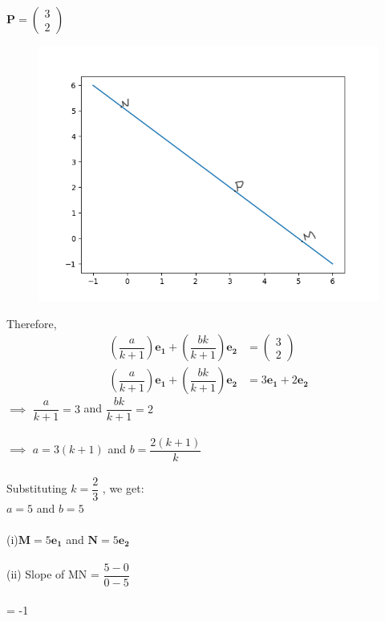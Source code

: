 \documentclass[journal,12pt,twocolumn]{IEEEtran}
\theoremstyle{remark}
\newcommand{\myvec}[1]{\ensuremath{\begin{pmatrix}#1\end{pmatrix}}}
\numberwithin{equation}{subsection}
\let\vec\mathbf
\begin{document}
 $ \vec{P} = \myvec{3 \\ 2}$\\
\begin{figure}[h]
\centering  
\includegraphics[width=\columnwidth]{figures/Figure_1.png} 
\end{figure}
Therefore,
\begin{align}
 \left( \dfrac{a}{k+1}\right) \vec{e_1}+\left( \dfrac{bk}{k+1}\right) \vec{e_2} &= \myvec{3 \\ 2}\\
 \left( \dfrac{a}{k+1}\right) \vec{e_1}+\left( \dfrac{bk}{k+1}\right) \vec{e_2} &= 3\vec{e_1}+2\vec{e_2}
\end{align}
  $\implies$ $\dfrac{a}{k+1} = 3$ and $\dfrac{bk}{k+1} = 2$\\\\
  $\implies$ $a = 3(k+1)$ and $b = \dfrac{2(k+1)}{k}$\\\\ 
Substituting $k = \dfrac{2}{3}$ , we get:\\
   $a = 5$ and $b = 5$\\\\
(i)$\vec{M} = 5\vec{e_1}$ and $\vec{N} = 5\vec{e_2}$\\\\
(ii) Slope of MN = $\dfrac{5-0}{0-5}$\\\\
     \hspace*{85pt} = -1
\end{document}
